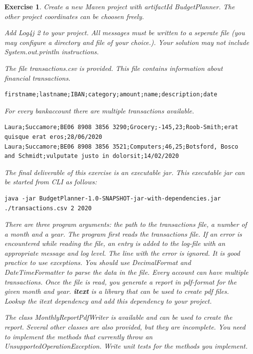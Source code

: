 \documentclass[a4paper, 12pt]{report}
\newenvironment{boxexercise}
{\begin{tcolorbox}
[enhanced jigsaw,breakable,pad at break*=1mm,
 colback=tsyellow!20,boxrule=0pt,frame hidden]}
{\end{tcolorbox}}
\newtheorem{envoefening}{\textbf{Exercise}}[chapter]
\newenvironment{oefening}
               {\begin{boxexercise}\begin{envoefening}}
               {\end{envoefening}\end{boxexercise}}
\begin{document}
\begin{oefening}
Create a new Maven project with artifactId BudgetPlanner.  The other project coordinates can be choosen freely.   

Add Log4j 2 to your project. All messages must be written to a seperate file (you may configure a directory and file of your choice.). Your solution may not include System.out.println instructions.
    
The file transactions.csv is provided. This file contains information about financial transactions. 
        
\begin{lstlisting}[frame=single]
firstname;lastname;IBAN;category;amount;name;description;date
\end{lstlisting}
    
For every bankaccount there are multiple transactions available.

\begin{lstlisting}[frame=single]
Laura;Succamore;BE06 8908 3856 3290;Grocery;-145,23;Roob-Smith;erat quisque erat eros;28/06/2020
Laura;Succamore;BE06 8908 3856 3521;Computers;46,25;Botsford, Bosco and Schmidt;vulputate justo in dolorsit;14/02/2020
\end{lstlisting}

The final deliverable of this exercise is an executable jar. This executable jar can be started from CLI as follows:

\begin{lstlisting}
java -jar BudgetPlanner-1.0-SNAPSHOT-jar-with-dependencies.jar ./transactions.csv 2 2020
\end{lstlisting}

There are three program arguments: the path to the transactions file, a number of a month and a year. 
The program first reads the transactions file. If an error is encountered while reading the file,  an entry is added to the log-file with an appropriate message and log level. The line with the error is ignored.
It is good practice to use exceptions. You should use DecimalFormat and DateTimeFormatter to parse the data in the file. Every account can have multiple transactions. Once the file is read, you generate a report in pdf-format for the given month and year. \textbf{itext} is a library that can be used to create pdf files.  Lookup the itext dependency and add this dependency to your project. 

The class MonthlyReportPdfWriter is available and can be used to create the report. 
Several other classes are also provided, but they are incomplete. You need to implement the methods that currently throw an UnsupportedOperationException. Write unit tests for the methods you implement. 


\end{oefening}
\end{document}
